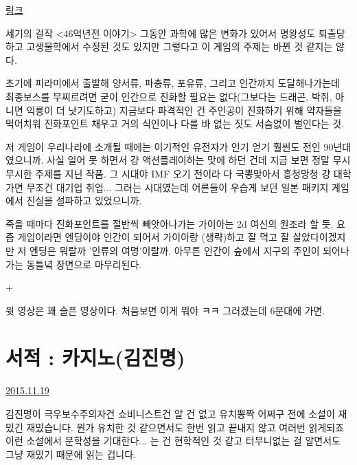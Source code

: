 \vspace{5mm}

\href{https://namu.wiki/w/46%EC%96%B5%EB%85%84%20%EC%9D%B4%EC%95%BC%EA%B8%B0}{링크}
\vspace{5mm}

세기의 걸작 <46억년전 이야기>
그동안 과학에 많은 변화가 있어서 명왕성도 퇴출당하고
고생물학에서 수정된 것도 있지만 그렇다고 이 게임의 주제는 바뀐 것 같지는 않다.
\vspace{5mm}

초기에 피라미에서 출발해 양서류, 파충류, 포유류, 그리고 인간까지 도달해나가는데
최종보스를 무찌르려면 굳이 인간으로 진화할 필요는 없다(그보다는 드래곤, 박쥐, 아니면 익룡이 더 낫기도하고)
지금보다 파격적인 건 주인공이 진화하기 위해 약자들을 먹어치워 진화포인트 채우고
거의 식인이나 다를 바 없는 짓도 서슴없이 벌인다는 것.
\vspace{5mm}

저 게임이 우리나라에 소개될 때에는 이기적인 유전자가 인기 얻기 훨씬도 전인 90년대였으니까.
사실 일어 못 하면서 걍 액션플레이하는 맛에 하던 건데 지금 보면 정말 무시무시한 주제를 지닌 작품.
그 시대야 IMF 오기 전이라 다 국뽕맞아서 흥청망청 걍 대학가면 무조건 대기업 취업... 그러는 시대였는데
어른들이 우습게 보던 일본 패키지 게임에서 진실을 설파하고 있었으니까.
\vspace{5mm}

죽을 때마다 진화포인트를 절반씩 빼앗아나가는 가이아는 2d 여신의 원조라 할 듯.
요즘 게임이라면 엔딩이야 인간이 되어서 가이아랑 (생략)하고 잘 먹고 잘 살았다이겠지만
저 엔딩은 뭐랄까 '인류의 여명'이랄까. 아무튼 인간이 숲에서 지구의 주인이 되어나가는 동틀녘 장면으로 마무리된다.
\vspace{5mm}

+
\vspace{5mm}

윗 영상은 꽤 슬픈 영상이다. 처음보면 이게 뭐야 ㅋㅋ 그러겠는데 6분대에 가면.
\vspace{5mm}




\section{서적 : 카지노(김진명)}
\href{https://www.kockoc.com/Apoc/501624}{2015.11.19}

\vspace{5mm}

김진명이 극우보수주의자건 쇼비니스트건 알 건 없고
유치뽕짝 어쩌구 전에 소설이 재밌긴 재밌습니다. 뭔가 유치한 것 같으면서도 한번 읽고 끝내지 않고 여러번 읽게되죠
이런 소설에서 문학성을 기대한다... 는 건 현학적인 것 같고 터무니없는 걸 알면서도 그냥 재밌기 때문에 읽는 겁니다.
\vspace{5mm}

